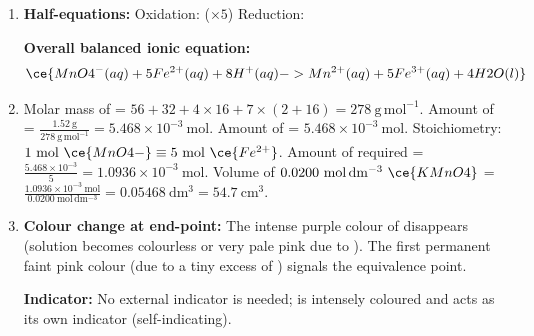 \documentclass[11pt]{article}
\begin{document}
\begin{corrige}
\begin{enumerate}
\item \textbf{Half-equations:}
Oxidation:  \quad ($\times 5$)
Reduction: 
\par \textbf{Overall balanced ionic equation:}
\[
\ce{MnO4^{-}(aq) + 5Fe^{2+}(aq) + 8H^{+}(aq) -> Mn^{2+}(aq) + 5Fe^{3+}(aq) + 4H2O(l)}
\]
\item Molar mass of  = $56 + 32 + 4\times16 + 7\times(2+16) = 278\ \mathrm{g\,mol^{-1}}$.
Amount of  = $\frac{1.52\ \mathrm{g}}{278\ \mathrm{g\,mol^{-1}}} = 5.468\times 10^{-3}\ \mathrm{mol}$.
Amount of  = $5.468\times 10^{-3}\ \mathrm{mol}$.
Stoichiometry: $1\ \mathrm{mol}\ \ce{MnO4-} \equiv 5\ \mathrm{mol}\ \ce{Fe^{2+}}$.
Amount of  required = $\frac{5.468\times 10^{-3}}{5} = 1.0936\times 10^{-3}\ \mathrm{mol}$.
Volume of $0.0200\ \mathrm{mol\,dm^{-3}}\ \ce{KMnO4}$ = $\frac{1.0936\times 10^{-3}\ \mathrm{mol}}{0.0200\ \mathrm{mol\,dm^{-3}}} = 0.05468\ \mathrm{dm^3} = \mathbf{54.7\ \mathrm{cm^3}}$.
\item \textbf{Colour change at end-point:} The intense purple colour of  disappears (solution becomes colourless or very pale pink due to ). The first permanent faint pink colour (due to a tiny excess of ) signals the equivalence point.
\par \textbf{Indicator:} No external indicator is needed;  is intensely coloured and acts as its own indicator (self-indicating).
\end{enumerate}
\end{corrige}
\end{document}
